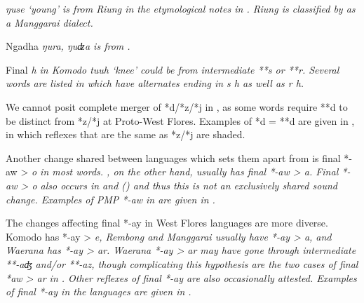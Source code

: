 \begin{table}
\begin{threeparttable}
\begin{tablenotes}
			\item[‡]	{\it{ŋuse} ‘young’ is from Riung in the etymological notes in \citet[114]{Verheijen1982}.
								Riung is classified by \citet{Verheijen1967} as a Manggarai dialect.}
			\item[Δ]	{Ngadha \it{ŋura,
								ŋuʣa} is from \citet[114]{Verheijen1982}.}
			\item[‖]	{Final \it{h} in Komodo \it{tuuh} ‘knee’ could be from intermediate **s or **r.
								Several words are listed in \citet{Verheijen1982} which have
								alternates ending in \it{s {\tl} h} as well as \it{r {\tl} h}.}
		\end{tablenotes}
	\end{threeparttable}
\end{table}

We cannot posit complete merger of *d/*z/*j in ,
as some words require **d to be distinct from *z/*j at Proto-West Flores.
Examples of *d = **d are given in ,
in which reflexes that are the same as *z/*j are shaded.

Another change shared between  languages which
sets them apart from  is final
*-aw > \it{o} in most words.
, on the other hand, usually has final *-aw > \it{a}.
Final *-aw > \it{o} also occurs in 
and  () and thus this is not an
exclusively shared sound change.
Examples of PMP *-aw in  are given in .

The changes affecting final *-ay in West Flores languages are more diverse.
Komodo has *-ay > \it{e},
Rembong and Manggarai usually have *-ay > \it{a},
and Waerana has *-ay > \it{ar}.
Waerana *-ay > \it{ar} may have gone through intermediate **-aʤ
and/or **-az, though complicating this hypothesis are the two cases of final
*{\nbhyp}aw > \it{ar} in .
Other reflexes of final *-ay are also occasionally attested.
Examples of final *-ay in the  languages are
given in .

